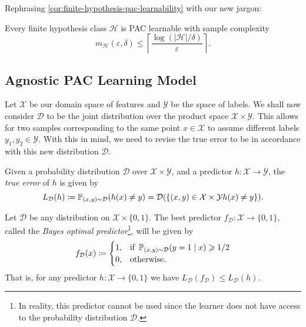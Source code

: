 Rephrasing \cref{cor:finite-hypothesis-pac-learnability} with our new jargon:

\begin{corollary}
\label{cor:finite-hypothesis-pac-learnability-succint}
Every finite hypothesis class \(\mathcal{H}\) is PAC learnable with sample complexity
\[
m_{\mathcal{H}}(\varepsilon, \delta) \leq
\left\lceil \frac{\log(|\mathcal{H}| / \delta)}{\varepsilon} \right\rceil.
\]
\end{corollary}

\subsection{Agnostic PAC Learning Model}

Let \(\mathcal{X}\) be our domain space of features and \(\mathcal{Y}\) be the
space of labels. We shall now consider \(\mathcal{D}\) to be the joint
distribution over the product space \(\mathcal{X} \times \mathcal{Y}\). This
allows for two samples corresponding to the same point \(x \in \mathcal{X}\) to
assume different labels \(y_1, y_2 \in \mathcal{Y}\). With this in mind, we need
to revise the true error to be in accordance with this new distribution
\(\mathcal{D}\).

\begin{definition}
\label{def:true-error-revised}
Given a probability distribution \(\mathcal{D}\) over \(\mathcal{X} \times
\mathcal{Y}\), and a predictor \(h: \mathcal{X} \to \mathcal{Y}\), the
\emph{true error} of \(h\) is given by
\[
L_{\mathcal{D}}(h) \coloneq \operatorname{\mathbb{P}}_{(x, y) \sim \mathcal{D}}(h(x) \neq y)
= \mathcal{D}(\{(x, y) \in \mathcal{X} \times \mathcal{Y} \relax h(x) \neq y\}).
\]
\end{definition}

\begin{proposition}
\label{prop:bayes-optimal-predictor}
Let \(\mathcal{D}\) be any distribution on \(\mathcal{X} \times \{0, 1\}\). The
best predictor \(f_{\mathcal{D}}: \mathcal{X} \to \{0, 1\}\), called the
\emph{Bayes optimal predictor}\footnote{In reality, this predictor cannot be
  used since the learner does not have access to the probability distribution
  \(\mathcal{D}\).}, will be given by
\[
f_{\mathcal{D}}(x) \coloneq
\begin{cases}
  1, &\text{if } \operatorname{\mathbb{P}}_{(x, y) \sim \mathcal{D}}(y = 1 \mid x) \geqslant 1/2 \\
  0, &\text{otherwise.}
\end{cases}
\]
That is, for any predictor \(h: \mathcal{X} \to \{0, 1\}\) we have
\(L_{\mathcal{D}}(f_{\mathcal{D}}) \leq L_{\mathcal{D}}(h)\).
\end{proposition}

